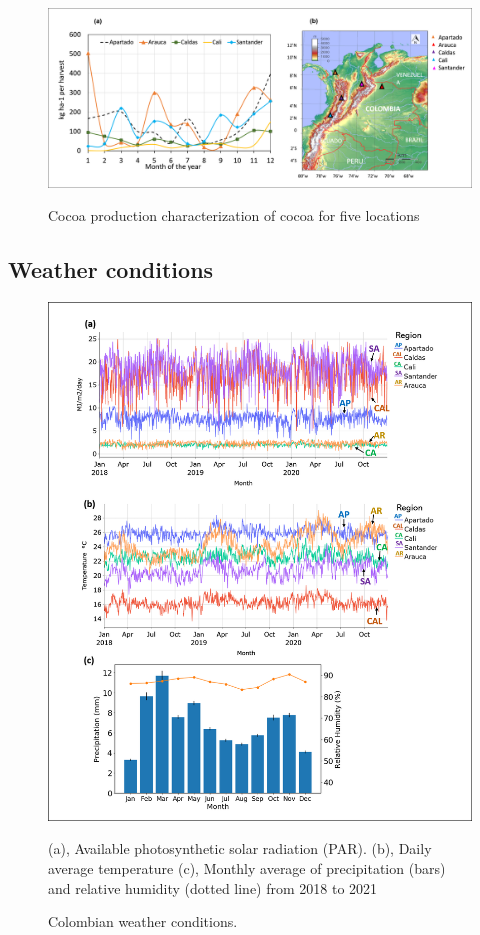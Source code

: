 \documentclass[gene,journal,article,submit,moreauthors,pdftex]{Definitions/mdpi}
\begin{document}
\begin{figure}[h]
	\centering
	\includegraphics[scale=0.3]{images/map.png}\\
	\caption{\footnotesize {Cocoa production characterization of cocoa for five locations\\}}
	\label{fig:yield}
\end{figure}
\newpage

\subsection{Weather conditions}
\begin{figure}[h!]
	\centering
	\includegraphics[scale=0.4]{images/clima.png}
	\caption{\footnotesize {Colombian weather conditions. \\}}	
	\label{fig:temp}
	{\footnotesize (a), Available photosynthetic solar radiation (PAR). (b), Daily average temperature  (c), Monthly average of precipitation (bars) and relative humidity (dotted line) from 2018 to 2021 }
\end{figure}
\newpage
\end{document}
